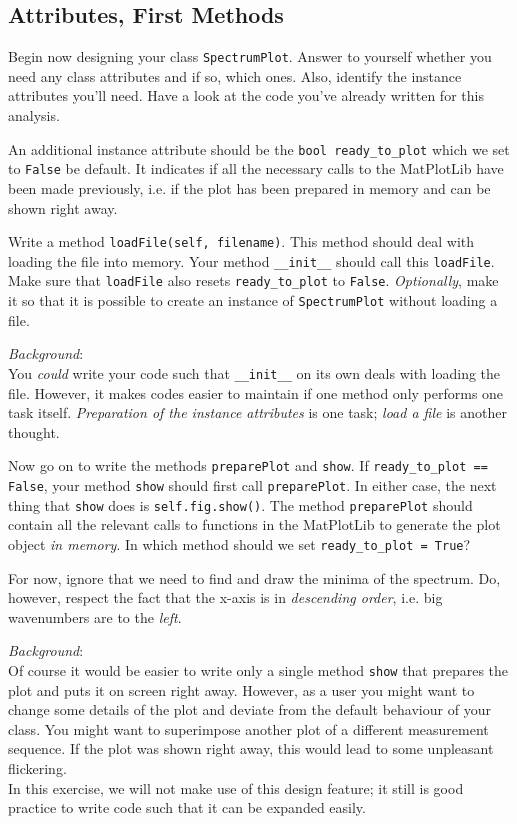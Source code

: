 \documentclass[
	english,
	fontsize=10pt,
	parskip=half,
	titlepage=true,
	DIV=12
]{scrartcl}
\newcommand*{\inPy}[1]{\texttt{#1}}
\newcommand*{\ie}{i.\;e. }
\begin{document}
\subsection{Attributes, First Methods}
Begin now designing your class \texttt{SpectrumPlot}. Answer to yourself whether you need any class attributes and if so, which ones. Also, identify the instance attributes you'll need. Have a look at the code you've already written for this analysis.

An additional instance attribute should be the \inPy{bool ready_to_plot} which we set to \inPy{False} be default. It indicates if all the necessary calls to the MatPlotLib have been made previously, \ie if the plot has been prepared in memory and can be shown right away.

Write a method \inPy{loadFile(self, filename)}. This method should deal with loading the file into memory. Your method \inPy{__init__} should call this \texttt{loadFile}. Make sure that \texttt{loadFile} also resets \inPy{ready_to_plot} to \inPy{False}. \emph{Optionally}, make it so that it is possible to create an instance of \texttt{SpectrumPlot} without loading a file.

\emph{Background}:\\
You \emph{could} write your code such that \inPy{__init__} on its own deals with loading the file. However, it makes codes easier to maintain if one method only performs one task itself. \emph{Preparation of the instance attributes} is one task; \emph{load a file} is another thought.

Now go on to write the methods \texttt{preparePlot} and \texttt{show}. If \inPy{ready_to_plot == False}, your method \texttt{show} should first call \texttt{preparePlot}. In either case, the next thing that \texttt{show} does is \texttt{self.fig.show()}. The method \texttt{preparePlot} should contain all the relevant calls to functions in the MatPlotLib to generate the plot object \emph{in memory}. In which method should we set \inPy{ready_to_plot = True}?

For now, ignore that we need to find and draw the minima of the spectrum. Do, however, respect the fact that the x-axis is in \emph{descending order}, \ie big wavenumbers are to the \emph{left}.

\emph{Background}:\\
Of course it would be easier to write only a single method \texttt{show} that prepares the plot and puts it on screen right away. However, as a user you might want to change some details of the plot and deviate from the default behaviour of your class. You might want to superimpose another plot of a different measurement sequence. If the plot was shown right away, this would lead to some unpleasant flickering.\\
In this exercise, we will not make use of this design feature; it still is good practice to write code such that it can be expanded easily.
\end{document}
